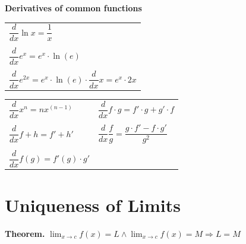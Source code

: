 \documentclass{article}
\begin{document}
\begin{center}
\pagebreak

\text{}

\vspace{0.7cm}


\textbf{Derivatives of common functions}

\vspace{0.3cm}

\begin{minipage}{0.4\textwidth}
  \begin{tabular}{l}
$\dfrac{d}{dx} \ln x = \dfrac{1}{x}$\\
\\
$\dfrac{d}{dx} e^x = e^x \cdot \ln(e)$\\
\\
$\dfrac{d}{dx} e^{2x} = e^x \cdot \ln(e) \cdot \dfrac{d}{dx} x = e^x \cdot 2x$
\end{tabular}
\end{minipage}
\begin{minipage}{0.5\textwidth}
\begin{tabular}{ll}
$\dfrac{d}{dx} x^n = nx^{(n-1)}$ & $\dfrac{d}{dx} f \cdot g = f'\cdot g + g' \cdot f$\\
\\
$\dfrac{d}{dx} f + h = f' + h'$ & $\dfrac{d}{dx} \dfrac{f}{g} = \dfrac{g\cdot f' - f \cdot g'}{g^2}$\\
\\
$\dfrac{d}{dx} f(g) = f'(g) \cdot g'$
\end{tabular}
\end{minipage}


\end{center}



\section{Uniqueness of Limits}

\textbf{Theorem.} $\displaystyle \lim_{x \to c} f(x) = L \land \lim_{x \to c} f(x) = M \Longrightarrow L = M$
\end{document}
